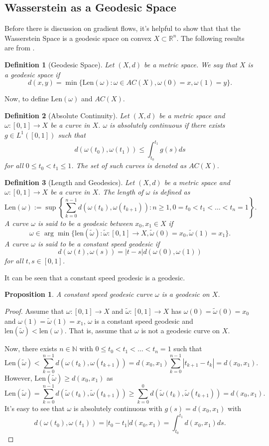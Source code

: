 \documentclass[12pt]{article}
\newcommand{\R}{\mathbb{R}}
\newcommand{\N}{\mathbb{N}}
\theoremstyle{plain}
\newtheorem{prop}{Proposition}[section]
\newtheorem{defn}{Definition}[section]
\numberwithin{equation}{section}
\begin{document}
\subsection{Wasserstein as a Geodesic Space}
Before there is discussion on gradient flows, it's helpful to show that that the Wasserstein Space is a geodesic space on convex $X\subset \R^n$. The following results are from \cite{santambrogio}.
\begin{defn}[Geodesic Space]
  Let $(X,d)$ be a metric space. We say that $X$ is a geodesic space if 
  \[d(x,y) = \min\{\text{Len}(\omega) : \omega\in AC(X),\omega(0) = x, \omega(1) = y\}.\]
\end{defn}
Now, to define $\text{Len}(\omega)$ and $AC(X)$.
\begin{defn}[Absolute Continuity]
  Let $(X,d)$ be a metric space and $\omega : [0,1]\to X$ be a curve in $X$. $\omega$ is absolutely continuous if there exists $g\in L^1([0,1])$ such that 
  \[d(\omega(t_0),\omega(t_1)) \le \int_{t_0}^{t_1} g(s)ds\]
  for all $0\le t_0 < t_1 \le 1$. The set of such curves is denoted as $AC(X)$.
\end{defn}
\begin{defn}[Length and Geodesics]
  Let $(X,d)$ be a metric space and $\omega : [0,1]\to X$ be a curve in $X$. The length of $\omega$ is defined as 
  \[\text{Len}(\omega):= \sup\left\{\sum_{k=0}^{n-1}d(\omega(t_k),\omega(t_{k+1})) : n\ge 1, 0 = t_0 <t_1 < \dots < t_n = 1\right\}.\]
  A curve $\omega$ is said to be a geodesic between $x_0,x_1\in X$ if 
  \[\omega \in \arg\min\{\text{len}(\tilde{\omega}) : \tilde{\omega}:[0,1]\to X, \tilde{\omega}(0) = x_0, \tilde{\omega}(1) = x_1\}.\]
  A curve $\omega$ is said to be a constant speed geodesic if 
  \[d(\omega(t),\omega(s)) = |t-s|d(\omega(0),\omega(1))\]
  for all $t,s\in [0,1]$.
\end{defn}
It can be seen that a constant speed geodesic is a geodesic.
\begin{prop}
  A constant speed geodesic curve $\omega$ is a geodesic on $X$.
\end{prop}
\begin{proof}
  Assume that $\omega: [0,1]\to X$ and $\tilde{\omega}: [0,1]\to X$ has $\omega(0) = \tilde{\omega}(0) = x_0$ and $\omega(1)=\tilde{\omega}(1) = x_1$,
  $\omega$ is a constant speed geodesic and $\text{len}(\tilde{\omega}) < \text{len}(\omega)$. That is, assume that $\omega$ is not a geodesic curve on $X$.

  Now, there exists $n\in \N$ with $0 \le t_0 < t_1 < \dots < t_n = 1$ such that 
  \[\text{Len}(\tilde{\omega}) < \sum_{k=0}^{n-1}d(\omega(t_k),\omega(t_{k+1})) = d(x_0,x_1)\sum_{k=0}^{n-1}|t_{k+1}-t_k| = d(x_0,x_1).\]
  However, $\text{Len}(\tilde{\omega}) \ge d(x_0,x_1)$ as 
  \[\text{Len}(\tilde{\omega}) = \sum_{k=0}^{n-1}d(\tilde{\omega}(t_k),\tilde{\omega}(t_{k+1})) \ge \sum_{k=0}^{0}d(\tilde{\omega}(t_k),\tilde{\omega}(t_{k+1})) = d(x_0,x_1).\]
  It's easy to see that $\omega$ is absolutely continuous with $g(s) = d(x_0,x_1)$ with
  \[d(\omega(t_0),\omega(t_1)) = |t_0-t_1|d(x_0,x_1) = \int_{t_0}^{t_1}d(x_0,x_1)ds.\]
\end{proof}
\end{document}
